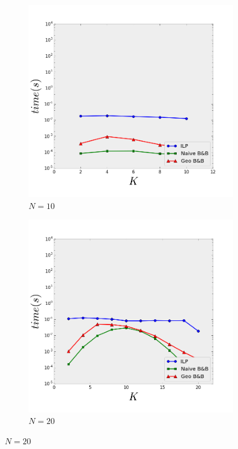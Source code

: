 \begin{figure}[t] 
  \begin{subfigure}[b]{0.3\linewidth}
    \centering
    \includegraphics[width=0.9\linewidth]{Pictures/n10} 
    \caption{$N=10$} 
    \label{fig:fixed_n:a} 
  \end{subfigure}%
  \begin{subfigure}[b]{0.3\linewidth}
    \centering
    \includegraphics[width=0.9\linewidth]{Pictures/n20} 
    \caption{$N=20$} 
    \label{fig:fixed_n:b} 
  \end{subfigure} 

\end{figure}
